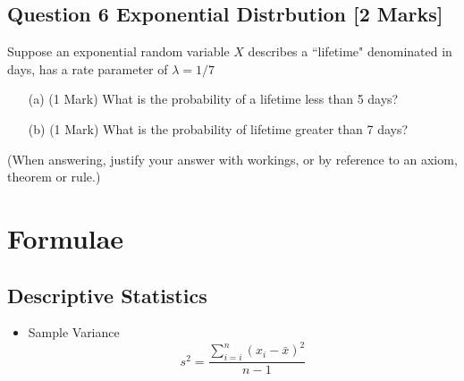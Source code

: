 \documentclass[a4paper,12pt]{article}
\begin{document}
\subsection*{Question 6 Exponential Distrbution [2 Marks]}

Suppose an exponential random variable $X$ describes a ``lifetime" denominated in days, has a rate parameter of $\lambda = 1/7$
\begin{itemize}
\item[(a)] (1 Mark) What is the probability of a lifetime less than 5 days?
\item[(b)] (1 Mark) What is the probability of lifetime greater than 7 days?
\end{itemize}


\noindent(When answering, justify your answer with workings, or by reference to an
axiom, theorem or rule.)
\bigskip










\newpage
\section*{Formulae}
\subsection*{Descriptive Statistics}
\begin{itemize}
\item Sample Variance
\begin{equation*}
s^2 = \frac{\sum^{n}_{i=i} (x_i-\bar{x})^2}{n-1}
\end{equation*}
\end{itemize}
\end{document}
